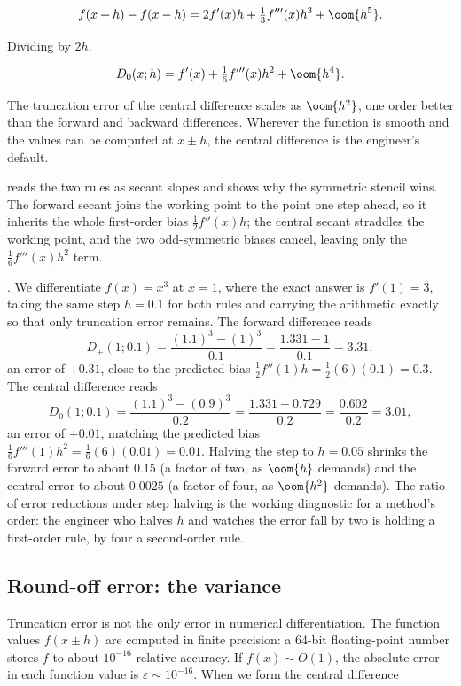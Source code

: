 \[
f(x + h) - f(x - h) = 2 f'(x) h + \tfrac{1}{3} f'''(x) h^{3} +
\oom{h^{5}}.
\]

Dividing by $2h$,

\[
D_{0}(x; h) = f'(x) + \tfrac{1}{6} f'''(x) h^{2} + \oom{h^{4}}.
\]

The truncation error of the central difference scales as $\oom
{h^{2}}$, one order better than the forward and backward
differences. Wherever the function is smooth and the values can
be computed at $x \pm h$, the central difference is the engineer's
default.



 reads the two rules as
secant slopes and shows why the symmetric stencil wins. The
forward secant joins the working point to the point one step ahead,
so it inherits the whole first-order bias $\tfrac{1}{2}f''(x)h$; the
central secant straddles the working point, and the two odd-symmetric
biases cancel, leaving only the $\tfrac{1}{6}f'''(x)h^{2}$ term.

. We
differentiate $f(x) = x^{3}$ at $x = 1$, where the exact answer is
$f'(1) = 3$, taking the same step $h = 0.1$ for both rules and
carrying the arithmetic exactly so that only truncation error
remains. The forward difference reads
\[
D_{+}(1; 0.1) = \frac{(1.1)^{3} - (1)^{3}}{0.1} =
\frac{1.331 - 1}{0.1} = 3.31,
\]
an error of $+0.31$, close to the predicted bias
$\tfrac{1}{2}f''(1)h = \tfrac{1}{2}(6)(0.1) = 0.3$. The central
difference reads
\[
D_{0}(1; 0.1) = \frac{(1.1)^{3} - (0.9)^{3}}{0.2} =
\frac{1.331 - 0.729}{0.2} = \frac{0.602}{0.2} = 3.01,
\]
an error of $+0.01$, matching the predicted bias
$\tfrac{1}{6}f'''(1)h^{2} = \tfrac{1}{6}(6)(0.01) = 0.01$. Halving
the step to $h = 0.05$ shrinks the forward error to about $0.15$ (a
factor of two, as $\oom{h}$ demands) and the central error to about
$0.0025$ (a factor of four, as $\oom{h^{2}}$ demands). The ratio of
error reductions under step halving is the working diagnostic for a
method's order: the engineer who halves $h$ and watches the error
fall by two is holding a first-order rule, by four a second-order
rule.

\subsection{Round-off error: the variance}

Truncation error is not the only error in numerical
differentiation. The function values $f(x \pm h)$ are computed in
finite precision: a 64-bit floating-point number stores $f$ to
about $10^{-16}$ relative accuracy. If $f(x) \sim O(1)$, the
absolute error in each function value is $\varepsilon \sim
10^{-16}$. When we form the central difference


